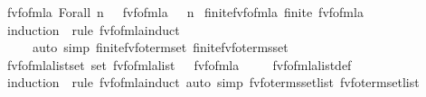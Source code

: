 \begin{isabellebody}
{\isacharbar}{\kern0pt}\ {\isachardoublequoteopen}fv{\isacharunderscore}{\kern0pt}fo{\isacharunderscore}{\kern0pt}fmla\ {\isacharparenleft}{\kern0pt}Forall\ n\ {\isasymphi}{\isacharparenright}{\kern0pt}\ {\isacharequal}{\kern0pt}\ fv{\isacharunderscore}{\kern0pt}fo{\isacharunderscore}{\kern0pt}fmla\ {\isasymphi}\ {\isacharminus}{\kern0pt}\ {\isacharbraceleft}{\kern0pt}n{\isacharbraceright}{\kern0pt}{\isachardoublequoteclose}\isanewline
\isanewline
{}\isamarkupfalse%
\ finite{\isacharunderscore}{\kern0pt}fv{\isacharunderscore}{\kern0pt}fo{\isacharunderscore}{\kern0pt}fmla{\isacharcolon}{\kern0pt}\ {\isachardoublequoteopen}finite\ {\isacharparenleft}{\kern0pt}fv{\isacharunderscore}{\kern0pt}fo{\isacharunderscore}{\kern0pt}fmla\ {\isasymphi}{\isacharparenright}{\kern0pt}{\isachardoublequoteclose}\isanewline
%
\isadelimproof
\ \ %
\endisadelimproof
%
\isatagproof
{}\isamarkupfalse%
\ {\isacharparenleft}{\kern0pt}induction\ {\isasymphi}\ rule{\isacharcolon}{\kern0pt}\ fv{\isacharunderscore}{\kern0pt}fo{\isacharunderscore}{\kern0pt}fmla{\isachardot}{\kern0pt}induct{\isacharparenright}{\kern0pt}\isanewline
\ \ \ \ \ {\isacharparenleft}{\kern0pt}auto\ simp{\isacharcolon}{\kern0pt}\ finite{\isacharunderscore}{\kern0pt}fv{\isacharunderscore}{\kern0pt}fo{\isacharunderscore}{\kern0pt}term{\isacharunderscore}{\kern0pt}set\ finite{\isacharunderscore}{\kern0pt}fv{\isacharunderscore}{\kern0pt}fo{\isacharunderscore}{\kern0pt}terms{\isacharunderscore}{\kern0pt}set{\isacharparenright}{\kern0pt}%
\endisatagproof
{\isafoldproof}%
%
\isadelimproof
\isanewline
%
\endisadelimproof
\isanewline
{}\isamarkupfalse%
\ fv{\isacharunderscore}{\kern0pt}fo{\isacharunderscore}{\kern0pt}fmla{\isacharunderscore}{\kern0pt}list{\isacharunderscore}{\kern0pt}set{\isacharcolon}{\kern0pt}\ {\isachardoublequoteopen}set\ {\isacharparenleft}{\kern0pt}fv{\isacharunderscore}{\kern0pt}fo{\isacharunderscore}{\kern0pt}fmla{\isacharunderscore}{\kern0pt}list\ {\isasymphi}{\isacharparenright}{\kern0pt}\ {\isacharequal}{\kern0pt}\ fv{\isacharunderscore}{\kern0pt}fo{\isacharunderscore}{\kern0pt}fmla\ {\isasymphi}{\isachardoublequoteclose}\isanewline
%
\isadelimproof
\ \ %
\endisadelimproof
%
\isatagproof
{}\isamarkupfalse%
\ fv{\isacharunderscore}{\kern0pt}fo{\isacharunderscore}{\kern0pt}fmla{\isacharunderscore}{\kern0pt}list{\isacharunderscore}{\kern0pt}def\isanewline
\ \ \isamarkupfalse%
\ {\isacharparenleft}{\kern0pt}induction\ {\isasymphi}\ rule{\isacharcolon}{\kern0pt}\ fv{\isacharunderscore}{\kern0pt}fo{\isacharunderscore}{\kern0pt}fmla{\isachardot}{\kern0pt}induct{\isacharparenright}{\kern0pt}\ {\isacharparenleft}{\kern0pt}auto\ simp{\isacharcolon}{\kern0pt}\ fv{\isacharunderscore}{\kern0pt}fo{\isacharunderscore}{\kern0pt}terms{\isacharunderscore}{\kern0pt}set{\isacharunderscore}{\kern0pt}list\ fv{\isacharunderscore}{\kern0pt}fo{\isacharunderscore}{\kern0pt}term{\isacharunderscore}{\kern0pt}set{\isacharunderscore}{\kern0pt}list{\isacharparenright}{\kern0pt}%

\end{isabellebody}
